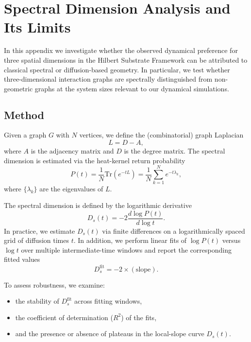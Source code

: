 \appendix
\section{Spectral Dimension Analysis and Its Limits}
\label{app:spectral_dimension}

In this appendix we investigate whether the observed dynamical preference for three spatial dimensions in the Hilbert Substrate Framework can be attributed to classical spectral or diffusion-based geometry. In particular, we test whether three-dimensional interaction graphs are spectrally distinguished from non-geometric graphs at the system sizes relevant to our dynamical simulations.

\subsection{Method}

Given a graph $G$ with $N$ vertices, we define the (combinatorial) graph Laplacian
\begin{equation}
L = D - A,
\end{equation}
where $A$ is the adjacency matrix and $D$ is the degree matrix. The spectral dimension is estimated via the heat-kernel return probability
\begin{equation}
P(t) = \frac{1}{N} \mathrm{Tr}\left(e^{-t L}\right) = \frac{1}{N} \sum_{k=1}^N e^{-t \lambda_k},
\end{equation}
where $\{\lambda_k\}$ are the eigenvalues of $L$.

The spectral dimension is defined by the logarithmic derivative
\begin{equation}
D_s(t) = -2 \frac{d \log P(t)}{d \log t}.
\end{equation}
In practice, we estimate $D_s(t)$ via finite differences on a logarithmically spaced grid of diffusion times $t$. In addition, we perform linear fits of $\log P(t)$ versus $\log t$ over multiple intermediate-time windows and report the corresponding fitted values
\begin{equation}
D_s^{\mathrm{fit}} = -2 \times (\text{slope}).
\end{equation}

To assess robustness, we examine:
\begin{itemize}
\item the stability of $D_s^{\mathrm{fit}}$ across fitting windows,
\item the coefficient of determination ($R^2$) of the fits,
\item and the presence or absence of plateaus in the local-slope curve $D_s(t)$.
\end{itemize}

